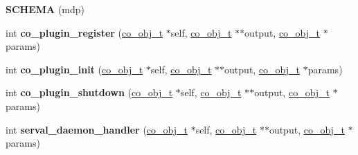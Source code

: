 \begin{DoxyCompactItemize}
\item 
\hypertarget{serval-dna_8c_a2fdb05eee64a7e5ebcf76b5859c92839}{{\bfseries S\+C\+H\+E\+M\+A} (mdp)}\label{serval-dna_8c_a2fdb05eee64a7e5ebcf76b5859c92839}

\item 
\hypertarget{serval-dna_8c_a3bbb939458a3edc82ae0bfe5602967df}{int {\bfseries co\+\_\+plugin\+\_\+register} (\hyperlink{structco__obj__t}{co\+\_\+obj\+\_\+t} $\ast$self, \hyperlink{structco__obj__t}{co\+\_\+obj\+\_\+t} $\ast$$\ast$output, \hyperlink{structco__obj__t}{co\+\_\+obj\+\_\+t} $\ast$params)}\label{serval-dna_8c_a3bbb939458a3edc82ae0bfe5602967df}

\item 
\hypertarget{serval-dna_8c_a0eccb03577be7f0f0e22a4d427f8773f}{int {\bfseries co\+\_\+plugin\+\_\+init} (\hyperlink{structco__obj__t}{co\+\_\+obj\+\_\+t} $\ast$self, \hyperlink{structco__obj__t}{co\+\_\+obj\+\_\+t} $\ast$$\ast$output, \hyperlink{structco__obj__t}{co\+\_\+obj\+\_\+t} $\ast$params)}\label{serval-dna_8c_a0eccb03577be7f0f0e22a4d427f8773f}

\item 
\hypertarget{serval-dna_8c_adef3d509f8db4a677d75c4bca5142d8a}{int {\bfseries co\+\_\+plugin\+\_\+shutdown} (\hyperlink{structco__obj__t}{co\+\_\+obj\+\_\+t} $\ast$self, \hyperlink{structco__obj__t}{co\+\_\+obj\+\_\+t} $\ast$$\ast$output, \hyperlink{structco__obj__t}{co\+\_\+obj\+\_\+t} $\ast$params)}\label{serval-dna_8c_adef3d509f8db4a677d75c4bca5142d8a}

\item 
\hypertarget{serval-dna_8c_a31d498ab46d883bda2967eca577b8890}{int {\bfseries serval\+\_\+daemon\+\_\+handler} (\hyperlink{structco__obj__t}{co\+\_\+obj\+\_\+t} $\ast$self, \hyperlink{structco__obj__t}{co\+\_\+obj\+\_\+t} $\ast$$\ast$output, \hyperlink{structco__obj__t}{co\+\_\+obj\+\_\+t} $\ast$params)}\label{serval-dna_8c_a31d498ab46d883bda2967eca577b8890}

\end{DoxyCompactItemize}
